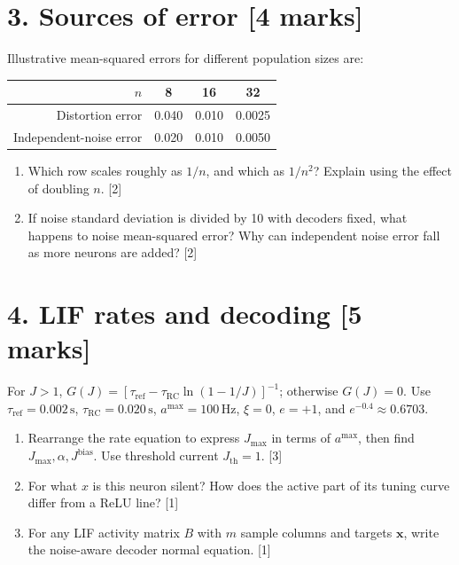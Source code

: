 \documentclass[10pt,letterpaper]{article}
\newcommand{\vct}[1]{\boldsymbol{#1}}
\begin{document}
\section*{3. Sources of error \hfill [4 marks]}
Illustrative mean-squared errors for different population sizes are:
\begin{center}\begin{tabular}{rccc}\toprule \(n\) & 8 & 16 & 32\\\midrule
Distortion error & 0.040 & 0.010 & 0.0025\\
Independent-noise error & 0.020 & 0.010 & 0.0050\\\bottomrule\end{tabular}\end{center}
\begin{enumerate}[label=\textbf{(\alph*)}]
\item Which row scales roughly as \(1/n\), and which as \(1/n^2\)? Explain using the effect of doubling \(n\). [2]
\item If noise standard deviation is divided by 10 with decoders fixed, what happens to noise mean-squared error? Why can independent noise error fall as more neurons are added? [2]
\end{enumerate}

\newpage
\section*{4. LIF rates and decoding \hfill [5 marks]}
For \(J>1\), \(G(J)=[\tau_{\mathrm{ref}}-\tau_{\mathrm{RC}}\ln(1-1/J)]^{-1}\); otherwise \(G(J)=0\). Use \(\tau_{\mathrm{ref}}=0.002\,\mathrm{s}\), \(\tau_{\mathrm{RC}}=0.020\,\mathrm{s}\), \(a^{\max}=100\,\mathrm{Hz}\), \(\xi=0\), \(e=+1\), and \(e^{-0.4}\approx0.6703\).
\begin{enumerate}[label=\textbf{(\alph*)}]
\item Rearrange the rate equation to express \(J_{\max}\) in terms of \(a^{\max}\), then find \(J_{\max},\alpha,J^{\mathrm{bias}}\). Use threshold current \(J_{\mathrm{th}}=1\). [3]
\item For what \(x\) is this neuron silent? How does the active part of its tuning curve differ from a ReLU line? [1]
\item For any LIF activity matrix \(B\) with \(m\) sample columns and targets \(\vct{x}\), write the noise-aware decoder normal equation. [1]
\end{enumerate}
\end{document}
